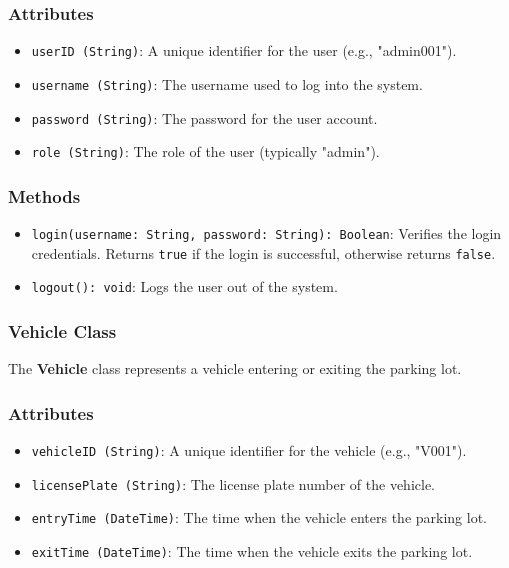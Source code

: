 \subsubsection*{Attributes}
\begin{itemize}
    \item \texttt{userID (String)}: A unique identifier for the user (e.g., "admin001").
    \item \texttt{username (String)}: The username used to log into the system.
    \item \texttt{password (String)}: The password for the user account.
    \item \texttt{role (String)}: The role of the user (typically "admin").
\end{itemize}

\subsubsection*{Methods}
\begin{itemize}
    \item \texttt{login(username: String, password: String): Boolean}: Verifies the login credentials. Returns \texttt{true} if the login is successful, otherwise returns \texttt{false}.
    \item \texttt{logout(): void}: Logs the user out of the system.
\end{itemize}

\subsubsection{Vehicle Class}
The \textbf{Vehicle} class represents a vehicle entering or exiting the parking lot.

\subsubsection*{Attributes}
\begin{itemize}
    \item \texttt{vehicleID (String)}: A unique identifier for the vehicle (e.g., "V001").
    \item \texttt{licensePlate (String)}: The license plate number of the vehicle.
    \item \texttt{entryTime (DateTime)}: The time when the vehicle enters the parking lot.
    \item \texttt{exitTime (DateTime)}: The time when the vehicle exits the parking lot.
\end{itemize}

